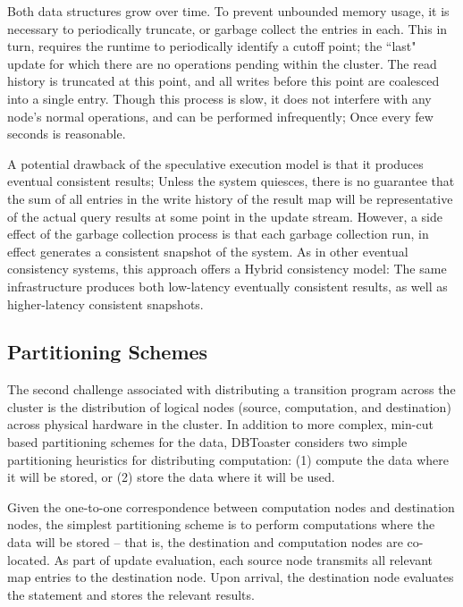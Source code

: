 Both data structures grow over time.  To prevent unbounded memory usage, it is necessary to periodically truncate, or garbage collect the entries in each.  This in turn, requires the runtime to periodically identify a cutoff point; the ``last" update for which there are no operations pending within the cluster.  The read history is truncated at this point, and all writes before this point are coalesced into a single entry.  Though this process is slow, it does not interfere with any node's normal operations, and can be performed infrequently; Once every few seconds is reasonable.

A potential drawback of the speculative execution model is that it produces eventual consistent results; Unless the system quiesces, there is no guarantee that the sum of all entries in the write history of the result map will be representative of the actual query results at some point in the update stream.  However, a side effect of the garbage collection process is that each garbage collection run, in effect generates a consistent snapshot of the system.  As in other eventual consistency systems\cite{bayou}, this approach offers a Hybrid consistency model: The same infrastructure produces both low-latency eventually consistent results, as well as higher-latency consistent snapshots.

\subsection{Partitioning Schemes}
The second challenge associated with distributing a transition program across the cluster is the distribution of logical nodes (source, computation, and destination) across physical hardware in the cluster.  In addition to more complex, min-cut based partitioning schemes for the data, DBToaster considers two simple partitioning heuristics for distributing computation: (1) compute the data where it will be stored, or (2) store the data where it will be used.  

Given the one-to-one correspondence between computation nodes and destination nodes, the simplest partitioning scheme is to perform computations where the data will be stored -- that is, the destination and computation nodes are co-located.  As part of update evaluation, each source node transmits all relevant map entries to the destination node.  Upon arrival, the destination node evaluates the statement and stores the relevant results.

